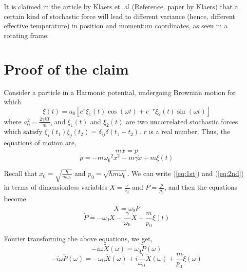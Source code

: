 \documentclass[12pt, twoside]{article}
\begin{document}
It is claimed in the article by Klaers et. al (Reference. paper by Klaers) that a certain kind of stochastic force will lead to different variance (hence, different effective temperature) in position and momentum coordinates, as seen in a rotating frame.

\section{Proof of the claim}
Consider a particle in a Harmonic potential, undergoing Brownian motion for which \begin{equation}\label{eq: stochastic}
	\xi(t) =  a_0 [e^r \xi_1(t) \cos(\omega t) + e^{-r} \xi_2(t)\sin(\omega t)]
\end{equation} where $a_0 ^ 2 = \frac{2 \gamma k T}{m}$, and $\xi_1(t)$ and $\xi_2(t)$ are two uncorrelated stochastic forces which satisfy $\overline{\xi_i(t_1)\xi_j(t_2)} = \delta_{ij}\delta(t_1 - t_2)$. $r$ is a real number. Thus, the equations of motion are, \begin{equation}\label{eq:1st}
m \dot{x} = p
\end{equation}
\begin{equation}\label{eq:2nd}
	\dot{p} = -m{\omega_0}^2 x^2 - m\gamma\dot{x} + m\xi(t)
\end{equation}

Recall that $x_0 =\sqrt{\frac{\hbar}{ m\omega_0}}$ and $p_0 = \sqrt{\hbar m \omega_0}$. We can write (\ref{eq:1st}) and (\ref{eq:2nd}) in terms of dimensionless variables $X = \frac{x}{x_0}$ and $P = \frac{p}{p_0}$, and then the equations become
\begin{equation}\label{eq:1}
	\dot{X} =\omega_0 P
\end{equation}
\begin{equation}\label{eq:2}
	\dot{P} = -\omega_0 X -\frac{\gamma}{\omega_0}\dot{X} + \frac{m}{p_0}\xi(t)
\end{equation}

Fourier transforming the above equations, we get, \begin{equation}\label{eq:1}
-i\omega\widetilde{X}(\omega) =\omega_0 \widetilde{P}(\omega)
\end{equation}
\begin{equation}\label{eq:2}
-i\omega\widetilde{P}(\omega) = -\omega_0 \widetilde{X}(\omega) +i\frac{\gamma}{\omega_0}\widetilde{X}(\omega) + \frac{m}{p_0}\widetilde{\xi}(\omega)
\end{equation}
\end{document}
